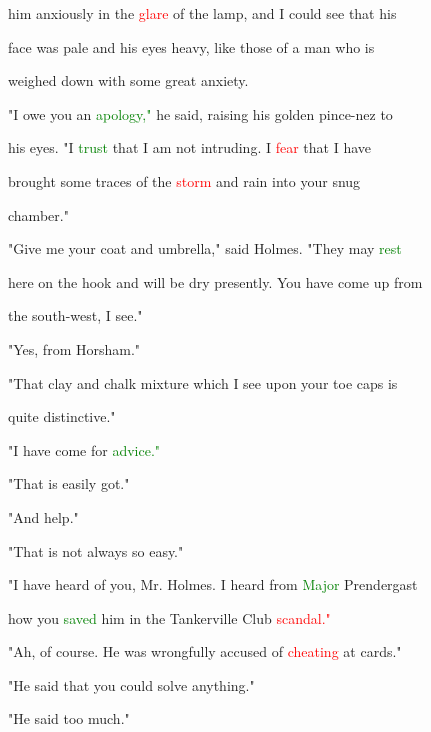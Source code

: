  him anxiously in the \textcolor{red}{glare} of the lamp, and I could see that his

 face was pale and his eyes heavy, like those of a man who is

 \textcolor{BurntOrange}{weighed} down with some great \textcolor{BurntOrange}{anxiety.}



 "I owe you an \textcolor{green}{apology,"} he said, raising his golden pince-nez to

 his eyes. "I \textcolor{green}{trust} that I am not intruding. I \textcolor{red}{fear} that I have

 brought some traces of the \textcolor{red}{storm} and rain into your snug

 chamber."



 "Give me your coat and umbrella," said Holmes. "They may \textcolor{green}{rest}

 here on the hook and will be dry presently. You have come up from

 the south-west, I see."



 "Yes, from Horsham."



 "That clay and chalk mixture which I see upon your toe \textcolor{BurntOrange}{caps} is

 quite distinctive."



 "I have come for \textcolor{green}{advice."}



 "That is easily got."



 "And help."



 "That is not always so easy."



 "I have heard of you, Mr. Holmes. I heard from \textcolor{green}{Major} Prendergast

 how you \textcolor{green}{saved} him in the Tankerville Club \textcolor{red}{scandal."}



 "Ah, of course. He was wrongfully accused of \textcolor{red}{cheating} at cards."



 "He said that you could solve anything."



 "He said too much."



